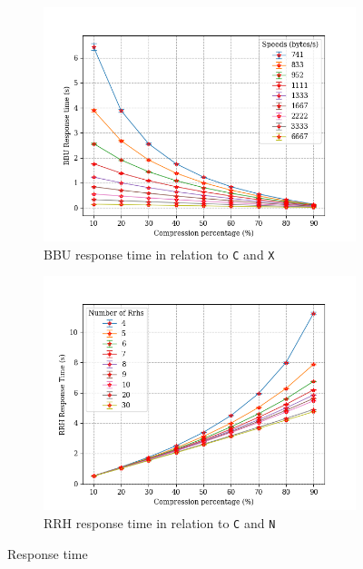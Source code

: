 \documentclass[11pt,a4paper,oneside, openright]{article}
\begin{document}
\begin{figure}[h]
  \centering
  \begin{subfigure}{.5\textwidth}
  	\centering
  	\includegraphics[width=\linewidth]{images/c-vs-response-time-bbu}
  	\caption{BBU response time in relation to \texttt{C} and \texttt{X}}
  	\label{fig:c-vs-response-time-bbu}
  \end{subfigure}%
  \begin{subfigure}{.5\textwidth}
    \centering
    \includegraphics[width=\linewidth]{images/c-vs-response-time-rrh}
    \caption{RRH response time in relation to \texttt{C} and \texttt{N}}
    \label{fig:c-vs-response-time-rrh}
  \end{subfigure}
  \caption{Response time}
  \label{fig:response-time}
\end{figure}
\end{document}
